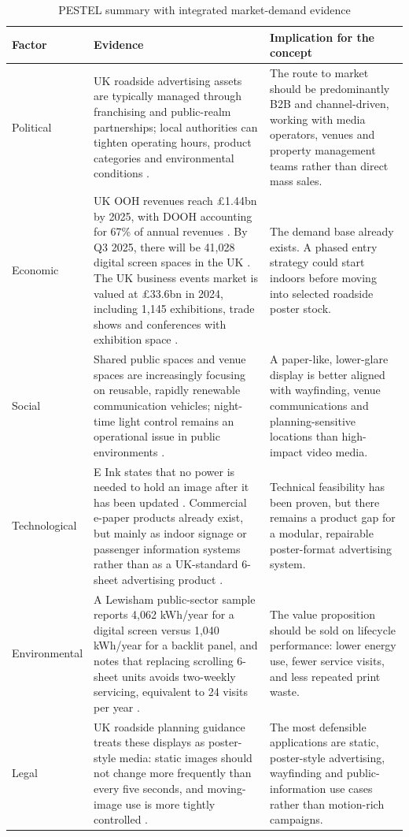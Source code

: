\documentclass[11pt,a4paper]{article}
\renewcommand{\arraystretch}{1.12}
\begin{document}
\begin{table}[H]
\centering
\caption{PESTEL summary with integrated market-demand evidence}
\scriptsize
\renewcommand{\arraystretch}{1.08}
\begin{tabularx}{\textwidth}{L{1.85cm}Y Y}
\toprule
\textbf{Factor} & \textbf{Evidence} & \textbf{Implication for the concept} \\
\midrule
Political & UK roadside advertising assets are typically managed through franchising and public-realm partnerships; local authorities can tighten operating hours, product categories and environmental conditions \cite{ref1}. & The route to market should be predominantly B2B and channel-driven, working with media operators, venues and property management teams rather than direct mass sales. \\
\addlinespace[1mm]
Economic & UK OOH revenues reach \pounds{}1.44bn by 2025, with DOOH accounting for 67\% of annual revenues \cite{ref4}. By Q3 2025, there will be 41,028 digital screen spaces in the UK \cite{ref5}. The UK business events market is valued at \pounds{}33.6bn in 2024, including 1,145 exhibitions, trade shows and conferences with exhibition space \cite{ref6}. & The demand base already exists. A phased entry strategy could start indoors before moving into selected roadside poster stock. \\
\addlinespace[1mm]
Social & Shared public spaces and venue spaces are increasingly focusing on reusable, rapidly renewable communication vehicles; night-time light control remains an operational issue in public environments \cite{ref1,ref6}. & A paper-like, lower-glare display is better aligned with wayfinding, venue communications and planning-sensitive locations than high-impact video media. \\
\addlinespace[1mm]
Technological & E Ink states that no power is needed to hold an image after it has been updated \cite{ref2}. Commercial e-paper products already exist, but mainly as indoor signage or passenger information systems rather than as a UK-standard 6-sheet advertising product \cite{ref7,ref8}. & Technical feasibility has been proven, but there remains a product gap for a modular, repairable poster-format advertising system. \\
\addlinespace[1mm]
Environmental & A Lewisham public-sector sample reports 4,062 kWh/year for a digital screen versus 1,040 kWh/year for a backlit panel, and notes that replacing scrolling 6-sheet units avoids two-weekly servicing, equivalent to 24 visits per year \cite{ref1}. & The value proposition should be sold on lifecycle performance: lower energy use, fewer service visits, and less repeated print waste. \\
\addlinespace[1mm]
Legal & UK roadside planning guidance treats these displays as poster-style media: static images should not change more frequently than every five seconds, and moving-image use is more tightly controlled \cite{ref3}. & The most defensible applications are static, poster-style advertising, wayfinding and public-information use cases rather than motion-rich campaigns. \\
\bottomrule
\end{tabularx}
\end{table}
\end{document}
